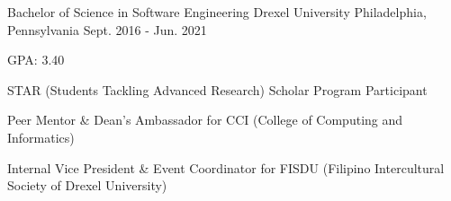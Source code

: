 

\begin{cventries}

  \cventry
    {Bachelor of Science in Software Engineering} %
    {Drexel University} %
    {Philadelphia, Pennsylvania} %
    {Sept. 2016 - Jun. 2021} %
    {
      \begin{cvitems} %
        \item GPA: 3.40
        \item STAR (Students Tackling Advanced Research) Scholar Program Participant
        \item Peer Mentor \& Dean's Ambassador for CCI (College of Computing and Informatics)
        \item Internal Vice President \& Event Coordinator for FISDU (Filipino Intercultural Society of Drexel University)
      \end{cvitems}
    }

\end{cventries}
